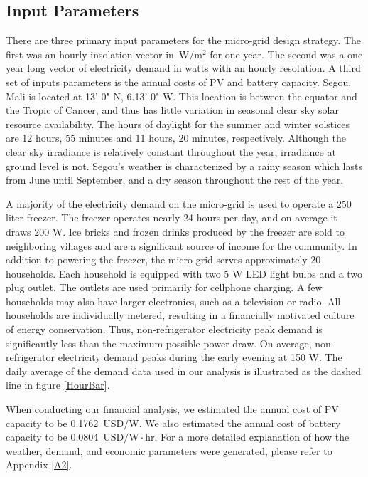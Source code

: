\documentclass{article}
\newcommand{\unit}[1]{\ensuremath{\, \mathrm{#1}}}
\begin{document}
\subsection{Input Parameters}


There are three primary input parameters for the micro-grid design strategy. 
The first was an hourly insolation vector in \unit{W \!/ m^2} for one year.
The second was a one year long vector of electricity demand in watts with an hourly resolution.
A third set of inputs parameters is the annual costs of PV and battery capacity. 
%
%
Segou, Mali is located at 13' 0" N, 6.13' 0" W. 
This location is between the equator and the Tropic of Cancer, and thus has little variation in seasonal clear sky solar resource availability. 
The hours of daylight for the summer and winter solstices are 12 hours, 55 minutes and 11 hours, 20 minutes, respectively.  
Although the clear sky irradiance is relatively constant throughout the year, irradiance at ground level is not.
Segou's weather is characterized by a rainy season which lasts from June until September, and a dry season throughout the rest of the year. 

A majority of the electricity demand on the micro-grid is used to operate
a 250 liter freezer.
The freezer operates nearly 24 hours per day, and on average it draws 200 W. 
Ice bricks and frozen drinks produced by the freezer are sold to neighboring villages and are a significant source of income for the community.
In addition to powering the freezer, the micro-grid serves approximately 20 households.
Each household is equipped with two 5 W LED light bulbs and a two plug outlet. 
The outlets are used primarily for cellphone charging.
A few households may also have larger electronics, such as a television or radio.
All households are individually metered, resulting in a financially motivated culture of energy conservation. 
Thus, non-refrigerator electricity peak demand is significantly less than the maximum possible power draw. 
On average, non-refrigerator electricity demand peaks during the early evening at 150 W.
The daily average of the demand data used in our analysis is illustrated as the dashed line in figure \ref{HourBar}.

When conducting our financial analysis, we estimated the annual cost of PV capacity to be 0.1762 \unit{USD/W}.
We also estimated the annual cost of battery capacity to be 0.0804 \unit{USD/ W  \! \cdot \! hr}. 
For a more detailed explanation of how the weather, demand, and economic parameters were generated, please refer to Appendix \ref{A2}.
\end{document}
